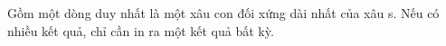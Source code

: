 Gồm một dòng duy nhất là một xâu con đối xứng dài nhất của xâu s. Nếu có nhiều kết quả, chỉ cần in ra một kết quả bất kỳ.